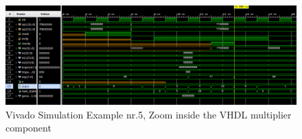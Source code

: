 \documentclass[]{IEEEtran}
\begin{document}
\begin{figure}[tb]
	\centering
	\includegraphics[scale=0.38]{figures/vivados4.png}
	\caption{Vivado Simulation Example nr.5, Zoom inside the VHDL multiplier component }
	\label{fig:vivado_s4}
\end{figure}

	
	
\end{document}
